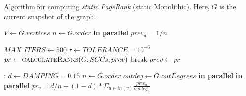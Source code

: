 \begin{algorithm}[!hbtp]
\caption{Algorithm for computing \emph{static PageRank} (static Monolithic). Here, $G$ is the current snapshot of the graph.}
\label{alg:static}
\begin{algorithmic}
\State $V \gets G.vertices$
\State $n \gets G.order$
 \textbf{in parallel}
  \State $prev_u = 1/n$
\EndFor
{}
\EndFunction

\Statex

  \State $MAX\_ITERS \gets 500$
  \State $\tau \gets TOLERANCE = 10^{-6}$
    \State $pr \gets \textsc{calculateRanks}(G, SCCs, prev)$
        \State $\textrm{break}$
    \EndIf
    \State $prev \gets pr$
  \EndFor
\EndFunction

\Statex

:
  \State $d \gets DAMPING = 0.15$
  \State $n \gets G.order$
  \State $outdeg \gets G.outDegrees$
   \textbf{in parallel}
     \textbf{in parallel}
      \State $pr_v = d/n + (1 - d) * \Sigma _{u \in in(v)} \frac{prev_u}{outdeg_u}$
    \EndFor
  \EndFor
\EndFunction
\end{algorithmic}
\end{algorithm}
